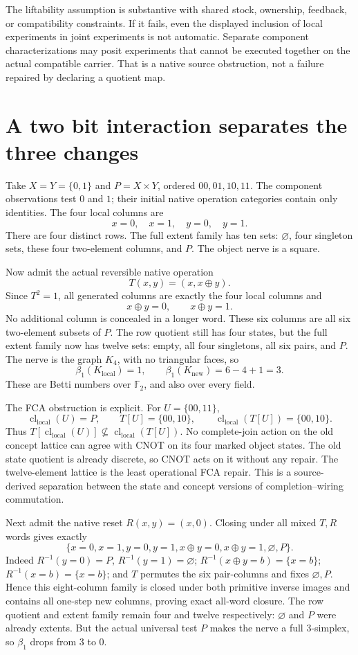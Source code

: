 \documentclass[11pt]{article}
\theoremstyle{definition}\newtheorem{definition}[theorem]{Definition}
\theoremstyle{remark}\newtheorem{remark}[theorem]{Remark}
\newcommand{\cl}{\operatorname{cl}}
\begin{document}
The liftability assumption is substantive with shared stock, ownership,
feedback, or compatibility constraints. If it fails, even the displayed
inclusion of local experiments in joint experiments is not automatic.
Separate component characterizations may posit experiments that cannot
be executed together on the actual compatible carrier. That is a native
source obstruction, not a failure repaired by declaring a quotient map.

\section{A two bit interaction separates the three changes}\label{sec:cnot}
Take $X=Y=\{0,1\}$ and $P=X\times Y$, ordered $00,01,10,11$.
The component observations test $0$ and $1$; their initial native
operation categories contain only identities. The four local columns
are
\[
 x=0,\quad x=1,\quad y=0,\quad y=1.
\]
There are four distinct rows. The full extent family has ten sets:
$\varnothing$, four singleton sets, these four two-element columns,
and $P$. The object nerve is a square.

Now admit the actual reversible native operation
\[
 T(x,y)=(x,x\oplus y).
\]
Since $T^2=1$, all generated columns are exactly the four local columns
and
\[
 x\oplus y=0,\qquad x\oplus y=1.
\]
No additional column is concealed in a longer word. These six columns
are all six two-element subsets of $P$. The row quotient still has
four states, but the full extent family now has twelve sets: empty,
all four singletons, all six pairs, and $P$. The nerve is the graph
$K_4$, with no triangular faces, so
\[
 \beta_1(K_{\mathrm{local}})=1,
 \qquad \beta_1(K_{\mathrm{new}})=6-4+1=3.
\]
These are Betti numbers over $\mathbb F_2$, and also over every field.

The FCA obstruction is explicit. For $U=\{00,11\}$,
\[
 \cl_{\mathrm{local}}(U)=P,
 \qquad
 T[U]=\{00,10\},
 \qquad
 \cl_{\mathrm{local}}(T[U])=\{00,10\}.
\]
Thus $T[\cl_{\mathrm{local}}(U)]\not\subseteq
\cl_{\mathrm{local}}(T[U])$. No complete-join action on the old
concept lattice can agree with CNOT on its four marked object states.
The old state quotient is already discrete, so CNOT acts on it without
any repair. The twelve-element lattice is the least operational FCA
repair. This is a source-derived separation between the state and
concept versions of completion--wiring commutation.

Next admit the native reset $R(x,y)=(x,0)$. Closing under all mixed
$T,R$ words gives exactly
\[
 \{x=0,x=1,y=0,y=1,x\oplus y=0,x\oplus y=1,\varnothing,P\}.
\]
Indeed $R^{-1}(y=0)=P$, $R^{-1}(y=1)=\varnothing$;
$R^{-1}(x\oplus y=b)=\{x=b\}$;
$R^{-1}(x=b)=\{x=b\}$; and $T$ permutes the six pair-columns
and fixes $\varnothing,P$. Hence this eight-column family is closed
under both primitive inverse images and contains all one-step new
columns, proving exact all-word closure. The row quotient and extent
family remain four and twelve respectively: $\varnothing$ and $P$
were already extents. But the actual universal test $P$ makes the
nerve a full $3$-simplex, so $\beta_1$ drops from $3$ to $0$.
\end{document}
